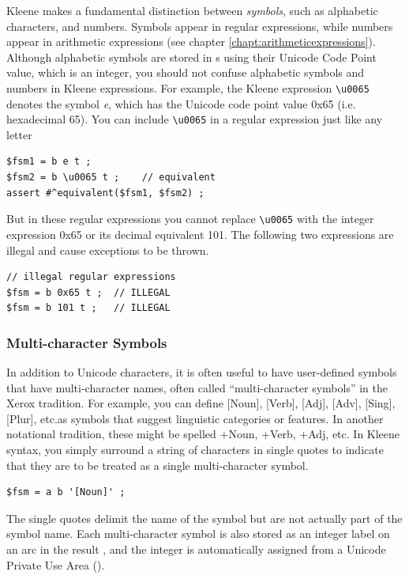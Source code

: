 Kleene makes a fundamental distinction between \emph{symbols}, such as
alphabetic characters, and numbers.  Symbols appear in regular
expressions, while numbers appear in arithmetic expressions (see chapter
\ref{chapt:arithmeticexpressions}).  Although alphabetic symbols are
stored in \fsm{}s using their Unicode Code Point value, which is an
integer, you should not confuse alphabetic symbols and numbers in Kleene
expressions.  For example, the Kleene expression \verb!\u0065! denotes
the symbol \emph{e}, which has the Unicode code point value 0x65 (i.e.\@
hexadecimal 65).  You can include \verb!\u0065! in a regular expression
just like any letter


\begin{Verbatim}
$fsm1 = b e t ;
$fsm2 = b \u0065 t ;	// equivalent
assert #^equivalent($fsm1, $fsm2) ;
\end{Verbatim}

\noindent
But in these regular expressions you cannot replace \verb!\u0065! with 
the integer expression 0x65 or its decimal equivalent 101.  The
following two expressions are illegal and cause exceptions to be thrown.


\begin{Verbatim}
// illegal regular expressions
$fsm = b 0x65 t ;  // ILLEGAL
$fsm = b 101 t ;   // ILLEGAL
\end{Verbatim}

\subsubsection{Multi-character Symbols}

In addition to Unicode characters, it is often useful to have user-defined symbols that
have multi-character names, often called ``multi-character symbols'' in
the Xerox tradition.  For example, you can
define [Noun], [Verb], [Adj], [Adv], [Sing], [Plur], etc.\@ as symbols that suggest
linguistic categories or features.  In another notational tradition, these might be spelled +Noun,
+Verb, +Adj, etc.  In Kleene syntax, you simply surround a string of characters in single quotes
to indicate that they are to be treated as a single multi-character symbol.


\begin{Verbatim}
$fsm = a b '[Noun]' ;
\end{Verbatim}

\noindent
The single quotes delimit the name of the symbol but are not actually part of the symbol
name.  Each multi-character symbol is also stored as an integer label on an arc in the result
\fsm{}, and the integer is automatically assigned from a Unicode Private Use Area ().

